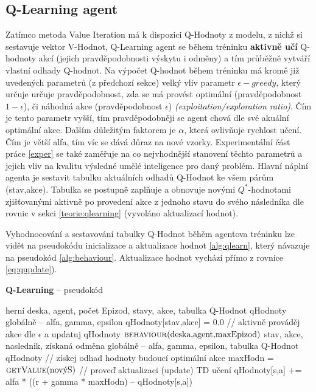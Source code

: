 \subsection*{Q-Learning agent}
\label{navrh:qlearnagent}
Zatímco metoda Value Iteration má k dispozici Q-Hodnoty z modelu, z nichž si sestavuje vektor V-Hodnot, Q-Learning agent se během tréninku \textbf{aktivně učí} Q-hodnoty akcí (jejich pravděpodobnosti výskytu i odměny) a tím průběžně vytváří vlastní odhady Q-hodnot. Na výpočet Q-hodnot během tréninku má kromě již uvedených parametrů (z předchozí sekce) velký vliv parametr $\epsilon-greedy$, který určuje určuje pravděpodobnost, zda se má provést optimální (pravděpodobnost $1-\epsilon$), či náhodná akce (pravděpodobnost $\epsilon$) \textit{(exploitation/exploration ratio)}. Čím je tento parametr vyšší, tím pravděpodobněji se agent chová dle své akuální optimální akce. Dalším důležitým faktorem je $\alpha$, která ovlivňuje rychlost učení. Čím je větší alfa, tím víc se dává důraz na nové vzorky. Experimentální část práce \ref{exper} se také zaměřuje na co nejvhodnější stanovení těchto parametrů a jejich vliv na kvalitu výsledné umělé inteligence pro daný problém.
\newline
Hlavní náplní agenta je sestavit tabulku aktuálních odhadů Q-Hodnot ke všem párům (stav,akce). Tabulka se postupně zaplňuje a obnovuje novými $Q^*$-hodnotami zjišťovanými aktivně po provedení akce z jednoho stavu do svého následníka dle rovnic v sekci \ref{teorie:qlearning} (vyvoláno aktualizací hodnot).

Vyhodnocování a sestavování tabulky Q-Hodnot běhěm agentova tréninku lze vidět na pseudokódu inicializace a aktualizace hodnot \ref{alg:qlearn}, který návazuje na pseudokód \ref{alg:behaviour}. Aktualizace hodnot vychází přímo z rovnice \ref{eq:qupdate}).
\begin{algorithm}
\caption{\textbf{Q-Learning} -- pseudokód}
\label{alg:qlearn}
\begin{algorithmic}[1]
\Require herní deska, agent, počet Epizod, stavy, akce, tabulka Q-Hodnot qHodnoty
\Require globálně -- alfa, gamma, epsilon
      \State qHodnoty[stav,akce] = 0.0 
    \EndFor
  \EndFor
  \State // aktivně prováděj akce dle $\epsilon$ a updatuj qHodnoty
  \State $\text{\Call{behaviour}{deska,agent,maxEpizod}}$
\EndProcedure
\algrule
\Require stav, akce, naslednik, získaná odměna
\Require globálně -- alfa, gamma, epsilon, tabulka Q-Hodnot qHodnoty
  \State // získej odhad hodnoty budoucí optimální akce
  \State maxHodn = $\text{\Call{getValue}{novýS}}$
  \State // proveď aktualizaci (update) TD učení
  \State qHodnoty[s,a] +=  alfa * ((r + gamma * maxHodn) -- qHodnoty[s,a])
\EndProcedure
\end{algorithmic}
\end{algorithm}
\newpage

